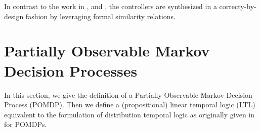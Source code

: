 \documentclass{ifacconf}
\begin{document}
 In contrast to the work in \cite{JonesDTL2013}, and  \cite{Vasile2016},  the  controllers are synthesized in a correcty-by-design fashion by leveraging formal similarity relations.
  
  
  
 
\section{Partially Observable Markov Decision Processes}

In this section, we give the definition of a Partially Observable Markov Decision Process (POMDP). Then we define a (propositional) linear temporal logic (LTL)  equivalent to the formulation of distribution temporal logic as originally given in \citep{JonesDTL2013} for POMDPs. 

%
%
%
%    
%   
%    
%    
   
\end{document}
